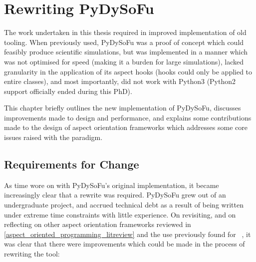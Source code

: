 \chapter{Rewriting PyDySoFu}\label{chap:pdsf_rewrite}


The work undertaken in this thesis required in improved implementation of old
tooling. When previously used, PyDySoFu was a proof of concept which could
feasibly produce scientific simulations, but was implemented in a manner which
was not optimised for speed (making it a burden for large simulations), lacked
granularity in the application of its aspect hooks (hooks could only be applied
to entire classes), and most importantly, did not work with Python3 (Python2
support officially ended during this PhD).

This chapter briefly outlines the new implementation of PyDySoFu, discusses
improvements made to design and performance, and explains some contributions
made to the design of aspect orientation frameworks which addresses some core
issues raised with the paradigm. 


\section{Requirements for Change}\label{sec:pdsf3requirements}

As time wore on with PyDySoFu's original implementation, it became increasingly
clear that a rewrite was required. PyDySoFu grew out of an undergraduate
project, and accrued technical debt as a result of being written under extreme
time constraints with little experience. On revisiting, and on reflecting on
other aspect orientation frameworks reviewed in  
\cref{aspect_oriented_programming_litreview} and the use
previously found for \pdsf{}~\cite{wallis2018caise, wallis2018genetic},
it was clear that there were improvements which could be made in the
process of rewriting the tool:

